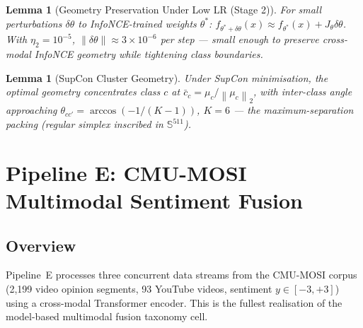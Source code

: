 \documentclass[12pt,a4paper]{article}
\theoremstyle{definition}
\theoremstyle{plain}
\newtheorem{lemma}[theorem]{Lemma}
\theoremstyle{remark}
\newcommand{\Sph}{\mathbb{S}}
\newcommand{\Norm}[1]{\left\|#1\right\|_2}
\begin{document}
\begin{lemma}[Geometry Preservation Under Low LR (Stage 2)]
For small perturbations $\delta\theta$ to InfoNCE-trained weights $\theta^*$: $f_{\theta^*+\delta\theta}(x) \approx f_{\theta^*}(x) + J_\theta \delta\theta$. With $\eta_2 = 10^{-5}$, $\|\delta\theta\| \approx 3 \times 10^{-6}$ per step — small enough to preserve cross-modal InfoNCE geometry while tightening class boundaries.
\end{lemma}

\begin{lemma}[SupCon Cluster Geometry]
Under SupCon minimisation, the optimal geometry concentrates class $c$ at $\bar{c}_c = \mu_c/\Norm{\mu_c}$, with inter-class angle approaching $\theta_{cc'} = \arccos(-1/(K-1))$, $K=6$ — the maximum-separation packing (regular simplex inscribed in $\Sph^{511}$).
\end{lemma}

\newpage
\section{Pipeline E: CMU-MOSI Multimodal Sentiment Fusion}
\label{sec:pipelineE}

\subsection{Overview}

Pipeline~E processes three concurrent data streams from the CMU-MOSI corpus (2,199 video opinion segments, 93 YouTube videos, sentiment $y \in [-3, +3]$) using a cross-modal Transformer encoder. This is the fullest realisation of the model-based multimodal fusion taxonomy cell.
\end{document}

